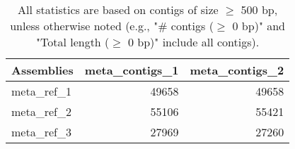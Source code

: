 \documentclass[12pt,a4paper]{article}
\begin{document}
\begin{table}[ht]
\begin{center}
\caption{All statistics are based on contigs of size $\geq$ 500 bp, unless otherwise noted (e.g., "\# contigs ($\geq$ 0 bp)" and "Total length ($\geq$ 0 bp)" include all contigs).}
\begin{tabular}{|l*{2}{|r}|}
\hline
Assemblies & meta\_contigs\_1 & meta\_contigs\_2 \\ \hline
meta\_ref\_1 & 49658 & 49658 \\ \hline
meta\_ref\_2 & 55106 & 55421 \\ \hline
meta\_ref\_3 & 27969 & 27260 \\ \hline
\end{tabular}
\end{center}
\end{table}
\end{document}
